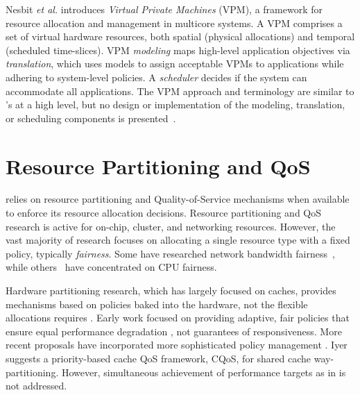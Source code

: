Nesbit \emph{et al.}\cite{1436097} introduces \emph{Virtual Private Machines} (VPM), a framework for resource allocation and management in multicore systems. A VPM comprises a set of virtual hardware resources, both spatial (physical allocations) and temporal (scheduled time-slices).
VPM \emph{modeling} maps high-level application objectives via
\emph{translation}, which uses models to assign acceptable VPMs to
applications while adhering to system-level policies. A
\emph{scheduler} decides if the system can accommodate all
applications. The VPM approach and terminology are similar to
\pacora's at a high level, but no design or implementation of the
modeling, translation, or scheduling components is presented~\cite{1436097}.
%

\section{Resource Partitioning and QoS}
\label{sec:rel:pm}

\pacora relies on resource partitioning and Quality-of-Service mechanisms when available to enforce its resource allocation decisions.  Resource partitioning and QoS research is active for on-chip, cluster, and networking resources.  However, the vast majority of research focuses on allocating a single resource type with a fixed policy, typically \emph{fairness}.
Some have researched network bandwidth fairness~\cite{Blanquer, Kleinberg99fairnessin, Liu}, while others~\cite{Baruah96proportionateprogress, Baruah_fastscheduling, Zhu} have concentrated on CPU fairness.

Hardware partitioning research, which has largely focused on caches, provides mechanisms based on policies baked into the hardware, not the flexible allocations \pacora requires \cite{876484, 967444,1194855,1275005,1194858,1318096,1088154,1399973,1069998,1399982}.  Early work focused on providing adaptive, fair policies that ensure equal performance degradation \cite{605420,1086328}, not guarantees of responsiveness. More recent proposals have incorporated more sophisticated policy management \cite{1241608,1331730,1152161,1254886}. Iyer\cite{1006246} suggests a priority-based cache QoS framework, CQoS, for shared cache way-partitioning.
However, simultaneous achievement of performance targets as in \pacora is not addressed.


